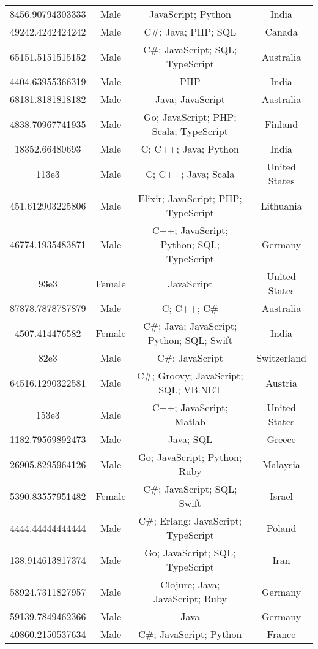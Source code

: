 \begin{center}
\begin{tabular}{ |c|c|c|c| }
8456.90794303333  &  Male  &  JavaScript; Python  &  India  \\ 
49242.4242424242  &  Male  &  C\#; Java; PHP; SQL  &  Canada  \\ 
65151.5151515152  &  Male  &  C\#; JavaScript; SQL; TypeScript  &  Australia  \\ 
4404.63955366319  &  Male  &  PHP  &  India  \\ 
68181.8181818182  &  Male  &  Java; JavaScript  &  Australia  \\ 
4838.70967741935  &  Male  &  Go; JavaScript; PHP; Scala; TypeScript  &  Finland  \\ 
18352.66480693  &  Male  &  C; C++; Java; Python  &  India  \\ 
113e3  &  Male  &  C; C++; Java; Scala  &  United States  \\ 
451.612903225806  &  Male  &  Elixir; JavaScript; PHP; TypeScript  &  Lithuania  \\ 
46774.1935483871  &  Male  &  C++; JavaScript; Python; SQL; TypeScript  &  Germany  \\ 
93e3  &  Female  &  JavaScript  &  United States  \\ 
87878.7878787879  &  Male  &  C; C++; C\#  &  Australia  \\ 
4507.414476582  &  Female  &  C\#; Java; JavaScript; Python; SQL; Swift  &  India  \\ 
82e3  &  Male  &  C\#; JavaScript  &  Switzerland  \\ 
64516.1290322581  &  Male  &  C\#; Groovy; JavaScript; SQL; VB.NET  &  Austria  \\ 
153e3  &  Male  &  C++; JavaScript; Matlab  &  United States  \\ 
1182.79569892473  &  Male  &  Java; SQL  &  Greece  \\ 
26905.8295964126  &  Male  &  Go; JavaScript; Python; Ruby  &  Malaysia  \\ 
5390.83557951482  &  Female  &  C\#; JavaScript; SQL; Swift  &  Israel  \\ 
4444.44444444444  &  Male  &  C\#; Erlang; JavaScript; TypeScript  &  Poland  \\ 
138.914613817374  &  Male  &  Go; JavaScript; SQL; TypeScript  &  Iran  \\ 
58924.7311827957  &  Male  &  Clojure; Java; JavaScript; Ruby  &  Germany  \\ 
59139.7849462366  &  Male  &  Java  &  Germany  \\ 
40860.2150537634  &  Male  &  C\#; JavaScript; Python  &  France  \\ 

\end{tabular}
\end{center}
